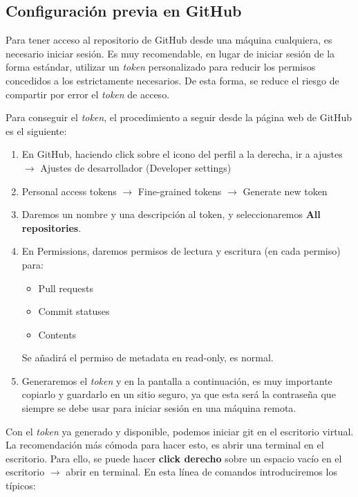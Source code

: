 \documentclass[
twoside,
12pt,                   
]{article}
\begin{document}
\subsection{Configuración previa en GitHub}
Para tener acceso al repositorio de GitHub desde una máquina cualquiera, es necesario iniciar sesión. Es muy recomendable, en lugar de iniciar sesión de la forma estándar, utilizar un \textit{token} personalizado para reducir los permisos concedidos a los estrictamente necesarios. De esta forma, se reduce el riesgo de compartir por error el \textit{token} de acceso. 
\par Para conseguir el \textit{token}, el procedimiento a seguir desde la página web de GitHub es el siguiente:
\begin{enumerate}
    \item En GitHub, haciendo click sobre el icono del perfil a la derecha, ir a ajustes $\to$ Ajustes de desarrollador (Developer settings)
    \item Personal access tokens $\to$ Fine-grained tokens $\to$ Generate new token
    \item Daremos un nombre y una descripción al token, y seleccionaremos \textbf{All repositories}.
    \item En Permissions, daremos permisos de lectura y escritura (en cada permiso) para:
    \begin{itemize}
        \vspace{-0.5em}
        \item Pull requests
        \vspace{-0.5em}
        \item Commit statuses
        \vspace{-0.5em}
        \item Contents
    \end{itemize}
    Se añadirá el permiso de metadata en read-only, es normal.
    \item Generaremos el \textit{token} y en la pantalla a continuación, es muy importante copiarlo y guardarlo en un sitio seguro, ya que esta será la contraseña que siempre se debe usar para iniciar sesión en una máquina remota.
\end{enumerate}
Con el \textit{token} ya generado y disponible, podemos iniciar git en el escritorio virtual. La recomendación más cómoda para hacer esto, es abrir una terminal en el escritorio. Para ello, se puede hacer \textbf{click derecho} sobre un espacio vacío en el escritorio $\to$ abrir en terminal. En esta línea de comandos introduciremos los típicos:
\end{document}

